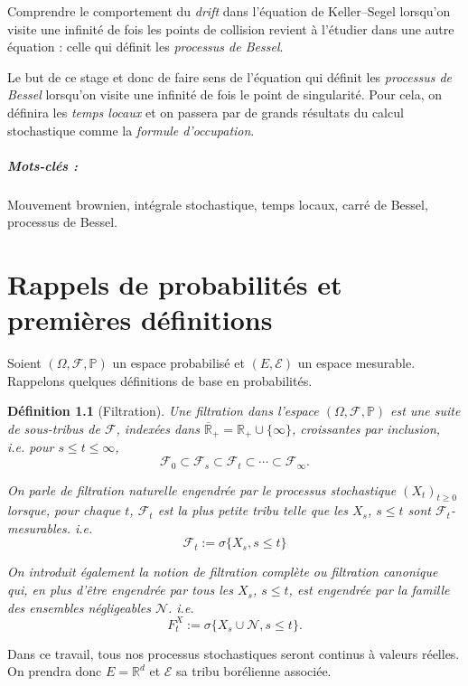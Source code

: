 \documentclass[openany]{book}
\newcommand{\F}{\mathscr{F}}
\newcommand{\N}{\mathscr{N}}
\newcommand{\carE}{\mathscr{E}}
\renewcommand{\P}{\mathds{P}}
\newcommand{\R}{\mathbb{R}}
\newcommand{\1}{\mathbbm{1}}
\theoremstyle{thmfont}
\theoremstyle{deffont}
\newtheorem{definition}[definition]{Définition}
\theoremstyle{thmfont}
\theoremstyle{deffont}
\begin{document}
Comprendre le comportement du \textit{drift} dans l'équation de Keller–Segel lorsqu’on visite une infinité de fois les points de collision revient à l'étudier dans une autre équation : celle qui définit les \textit{processus de Bessel}. 

Le but de ce stage et donc de faire sens de l'équation qui définit les \textit{processus de Bessel} lorsqu'on visite une infinité de fois le point de singularité. Pour cela, on définira les \textit{temps locaux} et on passera par de grands résultats du calcul stochastique comme la \textit{formule d'occupation}.

\paragraph{Mots-clés :}Mouvement brownien, intégrale stochastique, temps locaux, carré de Bessel, processus de Bessel.

\chapter{Rappels de probabilités et premières définitions}

Soient $(\Omega, \F, \P )$ un espace probabilisé et $(E, \carE)$ un espace mesurable. Rappelons quelques définitions de base en probabilités.

\begin{definition}[Filtration] Une \textit{filtration} dans l'espace $(\Omega, \F, \P )$ est une suite de sous-tribus de $\F$, indexées dans $\overline{\R}_+ = \R_+ \cup \{\infty\}$, croissantes par inclusion, \\
i.e. pour $s \leq t \leq \infty$,
$$\F_0 \subset \F_s \subset \F_t\subset \cdots \subset \F_\infty .$$

On parle de \textit{filtration naturelle} engendrée par le processus stochastique $(X_t)_{t\geq0}$ lorsque, pour chaque $t$, $\F_t$ est la plus petite tribu telle que les $X_s$, $s\leq t$ sont $\F_t$-mesurables. i.e.
$$\F_t := \sigma\{X_s, s\leq t\}$$

On introduit également la notion de \textit{filtration complète} ou
\textit{filtration canonique} qui, en plus d'être engendrée par tous les $X_s$, $s \leq t$, est engendrée par la famille des ensembles négligeables $\N$. i.e.
$$F^X_t := \sigma\{X_s\cup \N, s\leq t\}.$$

\label{def:filtration}
\end{definition}
Dans ce travail, tous nos processus stochastiques seront continus à valeurs réelles. On prendra donc $E = \R^d$ et $\carE$ sa tribu borélienne associée.
\end{document}
